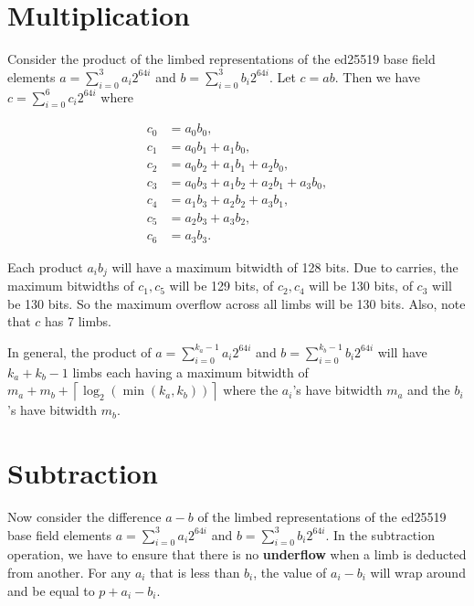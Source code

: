 \documentclass[a4paper, 12pt]{article}
\begin{document}
\section{Multiplication}%
\label{sec:multiplication}

Consider the product of the limbed representations of the ed25519 base field elements $a = \sum_{i=0}^3 a_i 2^{64i}$ and $b = \sum_{i=0}^3 b_i 2^{64i}$.  Let $c = ab$. Then we have $c = \sum_{i=0}^{6} c_i 2^{64i}$ where

\begin{align*}
c_0 & = a_0b_0,\\
c_1 & = a_0b_1 + a_1b_0,\\
c_2 & = a_0b_2 + a_1b_1 + a_2b_0,\\
c_3 & = a_0b_3 + a_1b_2 + a_2b_1 + a_3b_0,\\
c_4 & = a_1b_3 + a_2b_2 + a_3b_1,\\
c_5 & = a_2b_3 + a_3b_2,\\
c_6 & = a_3b_3.
\end{align*}

Each product $a_ib_j$ will have a maximum bitwidth of 128 bits. Due to carries, the maximum bitwidths of $c_1, c_5$ will be 129 bits, of $c_2, c_4$ will be 130 bits, of $c_3$ will be 130 bits. So the maximum overflow across all limbs will be 130 bits. Also, note that $c$ has 7 limbs.

In general, the product of $a = \sum_{i=0}^{k_a-1}a_i 2^{64 i}$ and $b= \sum_{i=0}^{k_b-1}b_i 2^{64 i}$ will have $k_a+k_b-1$ limbs each having a maximum bitwidth of $m_a+m_b+\left\lceil \log_2 \left( \min\left( k_a, k_b \right) \right) \right\rceil$ where the $a_i$'s have bitwidth $m_a$ and the $b_i$'s have bitwidth $m_b$.


\section{Subtraction}%
\label{sec:subtraction}
Now consider the difference $a-b$ of the limbed representations of the ed25519 base field elements $a = \sum_{i=0}^3 a_i 2^{64i}$ and $b = \sum_{i=0}^3 b_i 2^{64i}$.
In the subtraction operation, we have to ensure that there is no \textbf{underflow} when a limb is deducted from another. For any $a_i$ that is less than $b_i$, the value of $a_i - b_i$ will wrap around and be equal to $p+a_i - b_i$.
\end{document}
